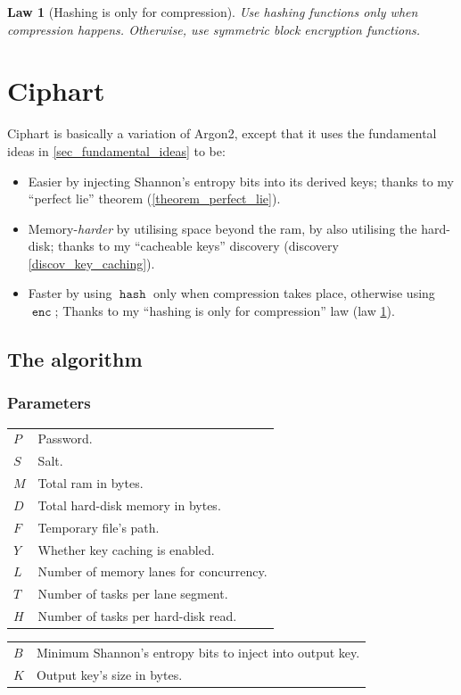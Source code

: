 \documentclass[twocolumn]{article}
\newtheorem{law}{Law}[section]
\DeclareMathOperator{\enc}{\mathtt{enc}}
\DeclareMathOperator{\hash}{\mathtt{hash}}
\begin{document}
\begin{law}[Hashing is only for compression]\label{law_simplification}
    Use hashing functions only when compression happens.  Otherwise, use
    symmetric block encryption functions.
\end{law}

\section{Ciphart}
Ciphart is basically a variation of Argon2, except that it uses the
fundamental ideas in \cref{sec_fundamental_ideas} to be:
\begin{itemize}
    \item Easier by injecting Shannon's entropy bits into its derived keys;
    thanks to my ``perfect lie'' theorem (\cref{theorem_perfect_lie}).

    \item Memory-\emph{harder} by utilising space beyond the \gls{ram}, by
    also utilising the hard-disk; thanks to my ``cacheable keys'' discovery
    (discovery \ref{discov_key_caching}).

    \item Faster by using $\hash$ only when compression takes place,
    otherwise using $\enc$; Thanks to my ``hashing is only for
    compression'' law (law \ref{law_simplification}).
\end{itemize}

\subsection{The algorithm}
\subsubsection{Parameters}
\begin{tabularx}{\columnwidth}{lX}
    $P$ & Password.\\
    $S$ & Salt.\\
    $M$ & Total \gls{ram} in bytes.\\
    $D$ & Total hard-disk memory in bytes.\\
    $F$ & Temporary file's path.\\
    $Y$ & Whether key caching is enabled.\\
    $L$ & Number of memory lanes for concurrency.\\
    $T$ & Number of tasks per lane segment.\\
    $H$ & Number of tasks per hard-disk read.\\
\end{tabularx}
\begin{tabularx}{\columnwidth}{lX}
    $B$ & Minimum Shannon's entropy bits to inject into output key.\\
    $K$ & Output key's size in bytes.\\
\end{tabularx}
\end{document}
